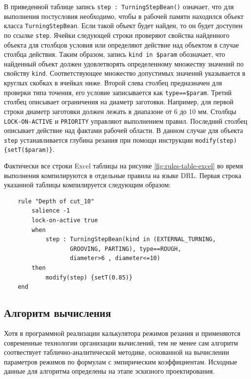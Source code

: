 \documentclass[14pt,oneside,final]{extreport}
\begin{document}
	 В приведенной таблице запись \texttt{step : TurningStepBean()} означает, что для выполнения постусловия необходимо, чтобы в рабочей памяти находился объект класса \texttt{TurningStepBean}. Если такой объект будет найден, то он будет доступен по ссылке \texttt{step}. Ячейки следующей строки проверяют свойства найденного объекта для столбцов условия или определяют действие над объектом в случае столбца действия. Таким образом, запись \texttt{kind in \$param} обозначает, что найденный объект должен удовлетворять определенному множеству значений по свойству \texttt{kind}. Соответствующее множество допустимых значений указывается в круглых скобках в ячейках ниже. Второй слева столбец предназначен для проверки типа точения, его условие записывается как \texttt{type==\$param}. Третий столбец описывает ограничения на диаметр заготовки. Например, для первой строки диаметр заготовки должен лежать в диапазоне от 6 до 10 мм. Столбцы \texttt{LOCK-ON-ACTIVE} и \texttt{PRIORITY} управляют выполнением правил. Последний столбец описывает действие над фактами рабочей области. В данном случае для объекта \texttt{step} устанавливается глубина резания при помощи инструкции \texttt{modify(step)\{setT(\$param)\}}. 
	 
	 Фактически все строки Excel таблицы на рисунке \ref{fig:rules-table-excel} во время выполнения компилируются в отдельные правила на языке DRL. Первая строка указанной таблицы компилируется следующим образом:
	\vspace{0.5cm}
	\begin{lstlisting} 
	rule "Depth of cut_10"
		salience -1
		lock-on-active true
		when
			step : TurningStepBean(kind in (EXTERNAL_TURNING, 
				   GROOVING, PARTING), type==ROUGH, 
				   diameter>6 , diameter<=10)
		then
			modify(step) {setT(0.85)}
	end
	\end{lstlisting}
	
	\subsection{Алгоритм вычисления}		
	Хотя в программной реализации калькулятора режимов резания и применяются современные технологии организации вычислений, тем не менее сам алгоритм соотвествует таблично-аналитической методике, основанной на вычислении параметров режимов по формулам с эмпирическим коэффициентам. Исходные данные для алгоритма определены на этапе эскизного проектирования.
	
\end{document}
